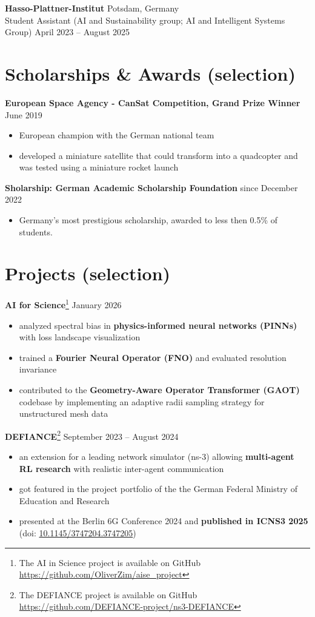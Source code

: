 \documentclass[10pt, a4paper]{article}
\begin{document}
\textbf{Hasso-Plattner-Institut} \hfill Potsdam, Germany \\
Student Assistant (AI and Sustainability group; AI and Intelligent Systems Group) \hfill April 2023 -- August 2025

\section*{Scholarships \& Awards (selection)}
\textbf{European Space Agency - CanSat Competition, Grand Prize Winner} \hfill June 2019
\begin{itemize}[noitemsep, topsep=2pt]
    \item European champion with the German national team
    \item developed a miniature satellite that could transform into a quadcopter and was tested using a miniature rocket launch
\end{itemize}

\textbf{Sholarship: German Academic Scholarship Foundation} \hfill since December 2022
\begin{itemize}[noitemsep, topsep=2pt]
    \item Germany's most prestigious scholarship, awarded to less then 0.5\% of students.
\end{itemize}

\section*{Projects (selection)}
\textbf{AI for Science}\footnote{The AI in Science project is available on GitHub \url{https://github.com/OliverZim/aise_project}} \hfill January 2026
\begin{itemize}[noitemsep, topsep=2pt]
    \item analyzed spectral bias in \textbf{physics-informed neural networks (PINNs)} with loss landscape visualization
    \item trained a \textbf{Fourier Neural Operator (FNO)} and evaluated resolution invariance
    \item contributed to the \textbf{Geometry-Aware Operator Transformer (GAOT)} codebase by implementing an adaptive radii sampling strategy for unstructured mesh data
\end{itemize}

\textbf{DEFIANCE}\footnote{The DEFIANCE project is available on GitHub \url{https://github.com/DEFIANCE-project/ns3-DEFIANCE}} \hfill September 2023 -- August 2024
\begin{itemize}[noitemsep, topsep=2pt]
    \item an extension for a leading network simulator (ns-3) allowing \textbf{multi-agent RL research} with realistic inter-agent communication
    \item got featured in the project portfolio of the the German Federal Ministry of Education and Research
    \item presented at the Berlin 6G Conference 2024 and \textbf{published in ICNS3 2025} (doi: \href{https://doi.org/10.1145/3747204.3747205}{10.1145/3747204.3747205})
\end{itemize}
\end{document}
